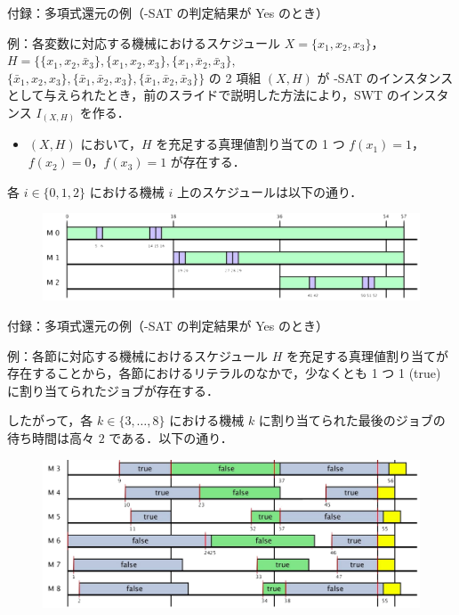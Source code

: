 \documentclass[dvipdfmx]{beamer}
\begin{document}
    \begin{frame}{付録：多項式還元の例（{-SAT} の判定結果が Yes のとき）}
      \begin{exampleblock}{例：各変数に対応する機械におけるスケジュール}
        $X = \{x_1,x_2,x_3\}$，$H = \big\{
        \{x_1,x_2,\bar x_3\},
        \{x_1,x_2,x_3\},
        \{x_1,\bar x_2,\bar x_3\},$
        \\
        $\{\bar x_1,x_2,x_3\},
        \{\bar x_1,\bar x_2,x_3\},
        \{\bar x_1,\bar x_2,\bar x_3\}
        \big\}$ の 2 項組 $(X,H)$ が {-SAT} のインスタンスとして与えられたとき，前のスライドで説明した方法により，SWT のインスタンス $I_{(X,H)}$ を作る．
        \begin{itemize}
          \item $(X,H)$ において，$H$ を充足する真理値割り当ての 1 つ $f(x_1) = 1$，$f(x_2) = 0$，$f(x_3) = 1$ が存在する．
        \end{itemize}
        各 $i \in \{0,1,2\}$ における機械 $i$ 上のスケジュールは以下の通り．
        \begin{figure}[h]
          \centering
          \includegraphics[width = 12cm]{figure/reductionExample1.pdf}
        \end{figure}
      \end{exampleblock}
    \end{frame}

    \begin{frame}{付録：多項式還元の例（{-SAT} の判定結果が Yes のとき）}
      \begin{exampleblock}{例：各節に対応する機械におけるスケジュール}
        $H$ を充足する真理値割り当てが存在することから，各節におけるリテラルのなかで，少なくとも 1 つ 1 (true) に割り当てられたジョブが存在する．

        したがって，各 $k \in \{3,\ldots,8\}$ における機械 $k$ に割り当てられた最後のジョブの待ち時間は高々 $2$ である．以下の通り．
        \begin{figure}[h]
          \centering
          \includegraphics[width = 12cm]{figure/reductionExample2.pdf}
        \end{figure}
      \end{exampleblock}
    \end{frame}
\end{document}
